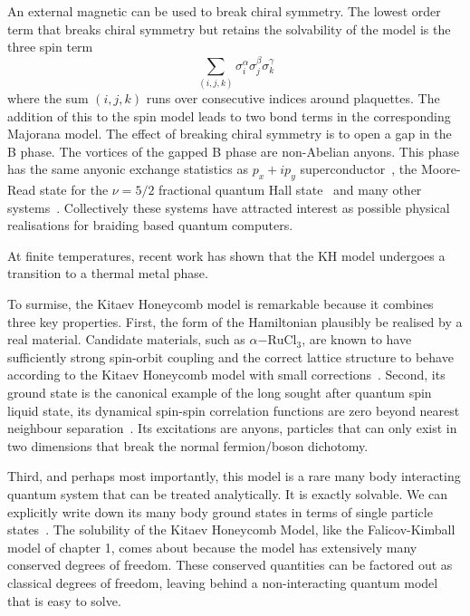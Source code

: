 An external magnetic can be used to break chiral symmetry. The lowest order term that breaks chiral symmetry but retains the solvability of the model is the three spin term \[
\sum_{(i,j,k)} \sigma_i^{\alpha} \sigma_j^{\beta} \sigma_k^{\gamma}
\] where the sum \((i,j,k)\) runs over consecutive indices around plaquettes. The addition of this to the spin model leads to two bond terms in the corresponding Majorana model. The effect of breaking chiral symmetry is to open a gap in the B phase. The vortices of the gapped B phase are non-Abelian anyons. This phase has the same anyonic exchange statistics as \(p_x + ip_y\) superconductor~\autocite{readPairedStatesFermions2000}, the Moore-Read state for the \(\nu = 5/2\) fractional quantum Hall state~\autocite{mooreNonabelionsFractionalQuantum1991} and many other systems~\autocite{aliceaNonAbelianStatisticsTopological2011,fuSuperconductingProximityEffect2008,lutchynMajoranaFermionsTopological2010,oregHelicalLiquidsMajorana2010,sauGenericNewPlatform2010}. Collectively these systems have attracted interest as possible physical realisations for braiding based quantum computers.

At finite temperatures, recent work has shown that the KH model undergoes a transition to a thermal metal phase.

To surmise, the Kitaev Honeycomb model is remarkable because it combines three key properties. First, the form of the Hamiltonian plausibly be realised by a real material. Candidate materials, such as \(\alpha\mathrm{-RuCl}_3\), are known to have sufficiently strong spin-orbit coupling and the correct lattice structure to behave according to the Kitaev Honeycomb model with small corrections~\autocite{banerjeeProximateKitaevQuantum2016,TrebstPhysRep2022}. Second, its ground state is the canonical example of the long sought after quantum spin liquid state, its dynamical spin-spin correlation functions are zero beyond nearest neighbour separation~\autocite{baskaranExactResultsSpin2007}. Its excitations are anyons, particles that can only exist in two dimensions that break the normal fermion/boson dichotomy.

Third, and perhaps most importantly, this model is a rare many body interacting quantum system that can be treated analytically. It is exactly solvable. We can explicitly write down its many body ground states in terms of single particle states~\autocite{kitaevAnyonsExactlySolved2006}. The solubility of the Kitaev Honeycomb Model, like the Falicov-Kimball model of chapter 1, comes about because the model has extensively many conserved degrees of freedom. These conserved quantities can be factored out as classical degrees of freedom, leaving behind a non-interacting quantum model that is easy to solve.
